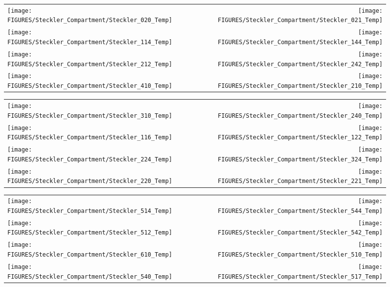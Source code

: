 \begin{figure}[p]
\begin{tabular*}{\textwidth}{l@{\extracolsep{\fill}}r}
\texttt{[image: FIGURES/Steckler\_Compartment/Steckler\_020\_Temp]} &
\texttt{[image: FIGURES/Steckler\_Compartment/Steckler\_021\_Temp]} \\
\texttt{[image: FIGURES/Steckler\_Compartment/Steckler\_114\_Temp]} &
\texttt{[image: FIGURES/Steckler\_Compartment/Steckler\_144\_Temp]} \\
\texttt{[image: FIGURES/Steckler\_Compartment/Steckler\_212\_Temp]} &
\texttt{[image: FIGURES/Steckler\_Compartment/Steckler\_242\_Temp]} \\
\texttt{[image: FIGURES/Steckler\_Compartment/Steckler\_410\_Temp]} &
\texttt{[image: FIGURES/Steckler\_Compartment/Steckler\_210\_Temp]}
\end{tabular*}
\label{Steckler_Temp_3}
\end{figure}

\begin{figure}[p]
\begin{tabular*}{\textwidth}{l@{\extracolsep{\fill}}r}
\texttt{[image: FIGURES/Steckler\_Compartment/Steckler\_310\_Temp]} &
\texttt{[image: FIGURES/Steckler\_Compartment/Steckler\_240\_Temp]} \\
\texttt{[image: FIGURES/Steckler\_Compartment/Steckler\_116\_Temp]} &
\texttt{[image: FIGURES/Steckler\_Compartment/Steckler\_122\_Temp]} \\
\texttt{[image: FIGURES/Steckler\_Compartment/Steckler\_224\_Temp]} &
\texttt{[image: FIGURES/Steckler\_Compartment/Steckler\_324\_Temp]} \\
\texttt{[image: FIGURES/Steckler\_Compartment/Steckler\_220\_Temp]} &
\texttt{[image: FIGURES/Steckler\_Compartment/Steckler\_221\_Temp]}
\end{tabular*}
\label{Steckler_Temp_4}
\end{figure}

\begin{figure}[p]
\begin{tabular*}{\textwidth}{l@{\extracolsep{\fill}}r}
\texttt{[image: FIGURES/Steckler\_Compartment/Steckler\_514\_Temp]} &
\texttt{[image: FIGURES/Steckler\_Compartment/Steckler\_544\_Temp]} \\
\texttt{[image: FIGURES/Steckler\_Compartment/Steckler\_512\_Temp]} &
\texttt{[image: FIGURES/Steckler\_Compartment/Steckler\_542\_Temp]} \\
\texttt{[image: FIGURES/Steckler\_Compartment/Steckler\_610\_Temp]} &
\texttt{[image: FIGURES/Steckler\_Compartment/Steckler\_510\_Temp]} \\
\texttt{[image: FIGURES/Steckler\_Compartment/Steckler\_540\_Temp]} &
\texttt{[image: FIGURES/Steckler\_Compartment/Steckler\_517\_Temp]}
\end{tabular*}
\label{Steckler_Temp_5}
\end{figure}

